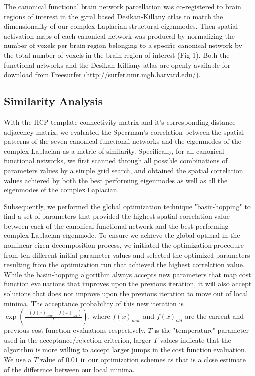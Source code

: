 \documentclass{article}
\begin{document}
The canonical functional brain network parcellation was co-registered to brain regions of interest in the gyral based Desikan-Killany atlas \cite{Desikan2006} to match the dimensionality of our complex Laplacian structural eigenmodes. Then spatial activation maps of each canonical network was produced by normalizing the number of voxels per brain region belonging to a specific canonical network by the total number of voxels in the brain region of interest (Fig 1). Both the functional networks and the Desikan-Killiany atlas are openly available for download from Freesurfer \cite{Fischl2012} (http://surfer.nmr.mgh.harvard.edu/).

\subsection{Similarity Analysis}
With the HCP template connectivity matrix and it's corresponding distance adjacency matrix, we evaluated the Spearman's correlation between the spatial patterns of the seven canonical functional networks and the eigenmodes of the complex Laplacian as a metric of similarity. Specifically, for all canonical functional networks, we first scanned through all possible combinations of parameters values by a simple grid search, and obtained the spatial correlation values achieved by both the best performing eigenmodes as well as all the eigenmodes of the complex Laplacian. 

Subsequently, we performed the global optimization technique "basin-hopping" \cite{Wales1997} to find a set of parameters that provided the highest spatial correlation value between each of the canonical functional network and the best performing complex Laplacian eigenmode. To ensure we achieve the global optimal in the nonlinear eigen decomposition process, we initiated the optimization procedure from ten different initial parameter values and selected the optimized parameters resulting from the optimization run that achieved the highest correlation value. While the basin-hopping algorithm always accepts new parameters that map cost function evaluations that improves upon the previous iteration, it will also accept solutions that does not improve upon the previous iteration to move out of local minima. The acceptance probability of this new iteration is $\exp(\frac{-(f(x)_{new} - f(x)_{old})}{T})$, where $f(x)_{new}$ and $f(x)_{old}$ are the current and previous cost function evaluations respectively. $T$ is the "temperature" parameter used in the acceptance/rejection criterion, larger $T$ values indicate that the algorithm is more willing to accept larger jumps in the cost function evaluation. We use a $T$ value of $0.01$ in our optimization schemes as that is a close estimate of the difference between our local minima.
\end{document}
